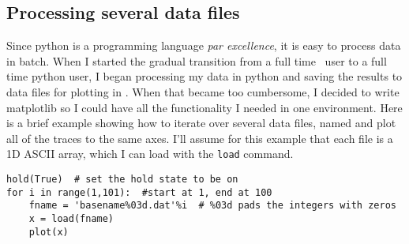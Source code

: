 \subsection{Processing several data files}
\label{sec:multiple_files}

Since python is a programming language \textit{par excellence}, it is
easy to process data in batch.  When I started the gradual transition
from a full time \matlab\ user to a full time python user, I began
processing my data in python and saving the results to data files for
plotting in \matlab.  When that became too cumbersome, I decided to
write matplotlib so I could have all the functionality I needed in one
environment.  Here is a brief example showing how to iterate over
several data files, named  and plot all of the traces to
the same axes.  I'll assume for this example that each file is a 1D
ASCII array, which I can load with the \texttt{load} command.

\begin{lstlisting}
hold(True)  # set the hold state to be on
for i in range(1,101):  #start at 1, end at 100
    fname = 'basename%03d.dat'%i  # %03d pads the integers with zeros
    x = load(fname)
    plot(x)
\end{lstlisting}



